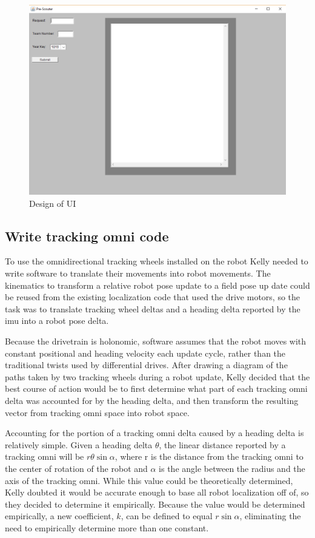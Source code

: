 \documentclass{article}
\begin{document}
\begin{figure}
    \centering
    \includegraphics[width=.6 \textwidth]{24_02-11/images/prescoutingapp.png}
    \caption{Design of UI}
    \label{fig:UI}
\end{figure}

\subsection{Write tracking omni code}
To use the omnidirectional tracking wheels installed on the robot Kelly needed to write software to translate their movements into robot movements. The kinematics to transform a relative robot pose update to a field pose up date could be reused from the existing localization code that used the drive motors, so the task was to translate tracking wheel deltas and a heading delta reported by the imu into a robot pose delta. 

Because the drivetrain is holonomic, software assumes that the robot moves with constant positional and heading velocity each update cycle, rather than the traditional twists used by differential drives. 
After drawing a diagram of the paths taken by two tracking wheels during a robot update, Kelly decided that the best course of action would be to first determine what part of each tracking omni delta was accounted for by the heading delta, and then transform the resulting vector from tracking omni space into robot space. 

Accounting for the portion of a tracking omni delta caused by a heading delta is relatively simple. Given a heading delta $\theta$, the linear distance reported by a tracking omni will be $r \theta \sin\alpha$, where r is the distance from the tracking omni to the center of rotation of the robot and $\alpha$ is the angle between the radius and the axis of the tracking omni. While this value could be theoretically determined, Kelly doubted it would be accurate enough to base all robot localization off of, so they decided to determine it empirically. Because the value would be determined empirically, a new coefficient, $k$, can be defined to equal $r \sin\alpha$, eliminating the need to empirically determine more than one constant.
\end{document}
